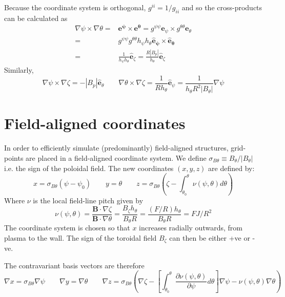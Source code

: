 \documentclass[12pt]{article}
\newcommand{\sbt}{\ensuremath{\sigma_{B\theta}}}
\newcommand{\deriv}[2]{\ensuremath{\frac{\partial #1}{\partial #2}}}
\newcommand{\hthe}{\ensuremath{h_\theta}}
\newcommand{\Bp}{\ensuremath{B_\theta}}
\newcommand{\Bt}{\ensuremath{B_\zeta}}
\begin{document}
Because the coordinate system is orthogonal, $g^{ii} = 1/g_{ii}$ and so the cross-products can be calculated as
\begin{eqnarray*}
\nabla\psi\times\nabla\theta = &\mathbf{e^\psi\times e^\theta} = 
g^{\psi\psi}\mathbf{e}_\psi\times g^{\theta\theta}\mathbf{e}_\theta \nonumber \\
= & g^{\psi\psi}g^{\theta\theta}h_\psi h_\theta\mathbf{\hat{e}_\psi\times\hat{e}_\theta} \nonumber \\
= &\frac{1}{h_\psi h_\theta}\mathbf{\hat{e}}_\zeta 
= \frac{R\left|B_p\right|}{h_\theta}\mathbf{\hat{e}}_\zeta
\end{eqnarray*}
Similarly, 
\[
\nabla\psi\times\nabla\zeta = -\left|B_p\right|\mathbf{\hat{e}}_\theta \qquad
\nabla\theta\times\nabla\zeta = \frac{1}{Rh_\theta}\mathbf{\hat{e}}_\psi = \frac{1}{h_\theta R^2\left|\Bp\right|}\nabla \psi
\]

\section{Field-aligned coordinates}

In order to efficiently simulate (predominantly) field-aligned structures, grid-points
are placed in a field-aligned coordinate system. We define $\sigma_{B\theta} \equiv B_\theta / \left|B_\theta\right|$
i.e. the sign of the poloidal field. The new coordinates $\left(x,y,z\right)$ are defined by:
\begin{equation}
x = \sbt\left(\psi - \psi_0\right) \qquad y = \theta \qquad z = \sigma_{B\theta}\left(\zeta - \int_{\theta_0}^{\theta}\nu\left(\psi, \theta\right)d\theta\right)
\label{eq:coordtransform}
\end{equation}
Where $\nu$ is the local field-line pitch given by
\begin{equation}
\nu\left(\psi, \theta\right) = \frac{\mathbf{B}\cdot\nabla\zeta}{\mathbf{B}\cdot\nabla\theta} = \frac{\Bt\hthe}{\Bp R} = \frac{\left(F/R\right)h_\theta}{B_\theta R} = FJ/R^2
\end{equation}
The coordinate system is chosen so that $x$ increases radially outwards, from plasma to the wall.
The sign of the toroidal field $\Bt$ can then be either +ve or -ve.

The contravariant basis vectors are therefore
\[
\nabla x = \sbt\nabla \psi \qquad \nabla y = \nabla \theta \qquad \nabla z = \sbt\left(\nabla\zeta - \left[\int_{\theta_0}^\theta\deriv{\nu\left(\psi, \theta\right)}{\psi} d\theta\right] \nabla\psi - \nu\left(\psi, \theta\right)\nabla\theta\right)
\]
\end{document}
